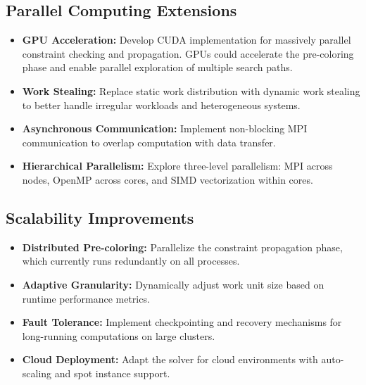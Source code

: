\subsection{Parallel Computing Extensions}
\begin{itemize}
    \item \textbf{GPU Acceleration:} Develop CUDA implementation for massively parallel constraint checking and propagation. GPUs could accelerate the pre-coloring phase and enable parallel exploration of multiple search paths.
    
    \item \textbf{Work Stealing:} Replace static work distribution with dynamic work stealing to better handle irregular workloads and heterogeneous systems.
    
    \item \textbf{Asynchronous Communication:} Implement non-blocking MPI communication to overlap computation with data transfer.
    
    \item \textbf{Hierarchical Parallelism:} Explore three-level parallelism: MPI across nodes, OpenMP across cores, and SIMD vectorization within cores.
\end{itemize}

\subsection{Scalability Improvements}
\begin{itemize}
    \item \textbf{Distributed Pre-coloring:} Parallelize the constraint propagation phase, which currently runs redundantly on all processes.
    
    \item \textbf{Adaptive Granularity:} Dynamically adjust work unit size based on runtime performance metrics.
    
    \item \textbf{Fault Tolerance:} Implement checkpointing and recovery mechanisms for long-running computations on large clusters.
    
    \item \textbf{Cloud Deployment:} Adapt the solver for cloud environments with auto-scaling and spot instance support.
\end{itemize}

